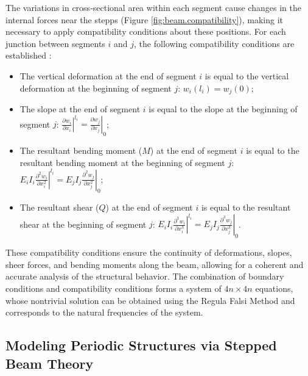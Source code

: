 The variations in cross-sectional area within each segment cause changes in the internal forces near the stepps (Figure \ref{fig:beam.compatibility}), making it necessary to apply compatibility conditions about these positions. For each junction between segments $i$ and $j$, the following compatibility conditions are established \cite{vaz2008}:
\begin{itemize}

\item [a)]The vertical deformation at the end of segment $i$ is equal to the vertical deformation at the beginning of segment $j$: $w_i(l_i) = w_j(0)$;

\item [b)] The slope at the end of segment $i$ is equal to the slope at the beginning of segment $j$: $\displaystyle \left.\frac{\partial w_i}{\partial x_i}\right|^{l_i} = \left.\frac{\partial w_j}{\partial x_j}\right|_0 $;

\item [c)]The resultant bending moment ($M$) at the end of segment $i$ is equal to the resultant bending moment at the beginning of segment $j$: $\displaystyle E_i I_i \left.\frac{\partial^2 w_i}{\partial x_i^2}\right|^{l_i} = E_j I_j \left.\frac{\partial^2 w_j}{\partial x_j^2}\right|_0$;

\item [d)] The resultant shear ($Q$) at the end of segment $i$ is equal to the resultant shear at the beginning of segment $j$: $\displaystyle E_i I_i \left.\frac{\partial^3 w_i}{\partial x_i^3}\right|^{l_i} = E_j I_j \left.\frac{\partial^3 w_j}{\partial x_j^3}\right|_0$.
\end{itemize}

These compatibility conditions ensure the continuity of deformations, slopes, sheer forces, and bending moments along the beam, allowing for a coherent and accurate analysis of the structural behavior. The combination of boundary conditions and compatibility conditions forms a system of $4n \times 4n$ equations, whose nontrivial solution can be obtained using the Regula Falsi Method and corresponds to the natural frequencies of the system.

\subsection{Modeling Periodic Structures via Stepped Beam Theory}


